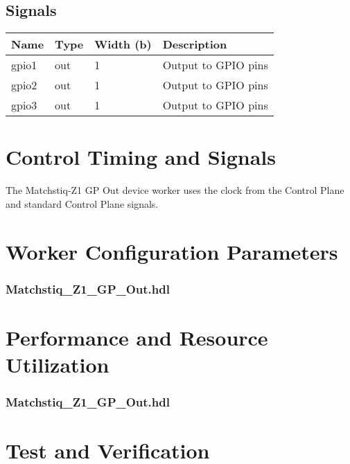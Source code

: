 \documentclass{article}
\def\comp{Matchstiq\_Z1\_GP\_Out}
\edef\ecomp{matchstiq_z1_gp_out}
\begin{document}
\begin{landscape}
\section*{Signals}
	\begin{scriptsize}
		\begin{tabular}{|M{2.5cm}|M{3cm}|M{6.5cm}|M{9.2cm}|}
			\hline
			Name         & Type   & Width (b) & Description                       \\
			\hline
			gpio1    & out & 1 & Output to GPIO pins            \\
			\hline
			gpio2    & out & 1 & Output to GPIO pins            \\
			\hline
			gpio3    & out & 1 & Output to GPIO pins            \\
			\hline
		\end{tabular}
	\end{scriptsize}
\end{landscape}

\section*{Control Timing and Signals}
\begin{flushleft}
The Matchstiq-Z1 GP Out device worker uses the clock from the Control Plane and standard Control Plane signals.
\end{flushleft}

\begin{landscape}
\section*{Worker Configuration Parameters}
\subsubsection*{\comp.hdl}

\section*{Performance and Resource Utilization}
\subsubsection*{\comp.hdl}

\end{landscape}



\section*{Test and Verification}
\normalsize
\end{document}
